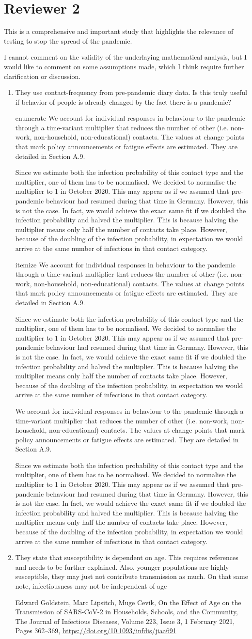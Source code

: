 \documentclass[a4paper,11pt]{article}
\makeatletter
\theoremstyle{plain}
\newlength{\parindentaux}
\newcommand*\@myenumerate{enumerate}
\newcommand*\@myitemize{itemize}
\newcommand{\comment}[1]{{\color{black!60}#1}}
\newcommand{\response}[1]{{%
		\color{black}%
		\par\frenchspacing%
		\ifx\@currenvir\@myenumerate%
		\addtolength{\leftskip}{-\parindentaux}%
		\rm\noindent #1\par%
		\addtolength{\leftskip}{\parindentaux}%
		\else%
		\ifx\@currenvir\@myitemize%
		\addtolength{\leftskip}{-\parindentaux}%
		\rm\noindent #1\par%
		\addtolength{\leftskip}{\parindentaux}%
		\else%
		\rm\noindent #1\par%
		\fi%
		\fi%
}}
\makeatother
\begin{document}
\section{Reviewer 2}

\comment{
This is a comprehensive and important study that highlights the relevance of testing to stop the spread of the pandemic.

I cannot comment on the validity of the underlaying mathematical analysis, but I would like to comment on some assumptions made, which I think require further clarification or discussion.

\begin{enumerate}
    \item They use contact-frequency from pre-pandemic diary data. Is  this truly useful if behavior of people is already changed by the fact there is a pandemic?
          \response{%
              We account for individual responses in behaviour to the pandemic through a time-variant multiplier that reduces the number of other (i.e. non-work, non-household, non-educational) contacts. The values at change points that mark policy announcements or fatigue effects are estimated. They are detailed in Section A.9.

              Since we estimate both the infection probability of this contact type and the multiplier, one of them has to be normalised. We decided to normalise the multiplier to 1 in October 2020. This may appear as if we assumed that pre-pandemic behaviour had resumed during that time in Germany. However, this is not the case. In fact, we would achieve the exact same fit if we doubled the infection probability and halved the multiplier. This is because halving the multiplier means only half the number of contacts take place. However, because of the doubling of the infection probability, in expectation we would arrive at the same number of infections in that contact category.
          }
    \item They state that susceptibility is dependent on age. This requires references and needs to be further explained. Also, younger populations are highly susceptible, they may just not contribute transmission as much. On that same note, infectiousness may not be independent of age

          Edward Goldstein, Marc Lipsitch, Muge Cevik, On the Effect of Age on the Transmission of SARS-CoV-2 in Households, Schools, and the Community, The Journal of Infectious Diseases, Volume 223, Issue 3, 1 February 2021, Pages 362–369, \url{https://doi.org/10.1093/infdis/jiaa691}


\end{enumerate}}
\end{document}
